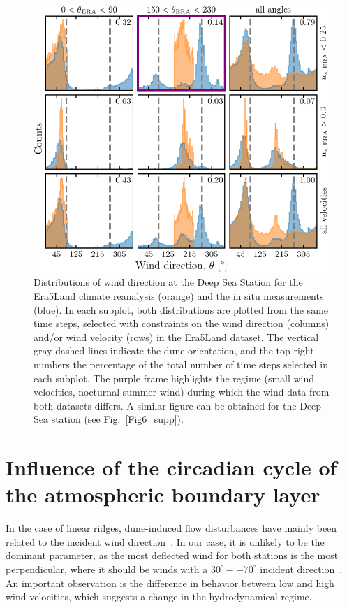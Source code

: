   \begin{figure}
    \centering
    \includegraphics[scale=1]{Figures/Figure3.pdf}
    \caption{Distributions of wind direction at the Deep Sea Station for the Era5Land climate reanalysis (orange) and the in situ measurements (blue). In each subplot, both distributions are plotted from the same time steps, selected with constraints on the wind direction (columns) and/or wind velocity (rows) in the Era5Land dataset. The vertical gray dashed lines indicate the dune orientation, and the top right numbers the percentage of the total number of time steps selected in each subplot. The purple frame highlights the regime (small wind velocities, nocturnal summer wind) during which the wind data from both datasets differs. A similar figure can be obtained for the Deep Sea station (see Fig.~\ref{Fig6_supp}).}
    \label{Fig3}
  \end{figure}


  \section{Influence of the circadian cycle of the atmospheric boundary layer}

  In the case of linear ridges, dune-induced flow disturbances have mainly been related to the incident wind direction~\citep{Walker2009, Hesp2015}. In our case, it is unlikely to be the dominant parameter, as the most deflected wind for both stations is the most perpendicular, where it should be winds with a $30^{\circ}--70^{\circ}$ incident direction~\citep{Hesp2015}.
  An important observation is the difference in behavior between low and high wind velocities, which suggests a change in the hydrodynamical regime.

